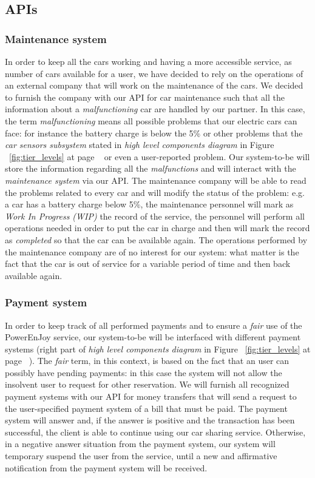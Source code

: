 \documentclass[10pt, a4paper,titlepage]{article}
\begin{document}
\subsection{APIs}
\subsubsection{Maintenance system}
In order to keep all the cars working and having a more accessible service, as number of cars available for a user, we have decided to rely on the operations of an external company that will work on the maintenance of the cars. We decided to furnish the company with our API for car maintenance such that all the information about a \emph{malfunctioning} car are handled by our partner. In this case, the term \emph{malfunctioning} means all possible problems that our electric cars can face: for instance the battery charge is below the 5\% or other problems that the \emph{car sensors subsystem} stated in \emph{high level components diagram} in Figure ~\ref{fig:tier_levels} at page ~\pageref{fig:tier_levels} or even a user-reported problem. Our system-to-be will store the information regarding all the \emph{malfunctions} and will interact with the \emph{maintenance system} via our API. The maintenance company will be able to read the problems related to every car and will modify the status of the problem: e.g. a car has a battery charge below 5\%, the maintenance personnel will mark as \emph{Work In Progress (WIP)} the record of the service, the personnel will perform all operations needed in order to put the car in charge and then will mark the record as \emph{completed} so that the car can be available again. The operations performed by the maintenance company are of no interest for our system: what matter is the fact that the car is out of service for a variable period of time and then back available again.
\subsubsection{Payment system}
In order to keep track of all performed payments and to ensure a \emph{fair} use of the PowerEnJoy service, our system-to-be will be interfaced with different payment systems (right part of \emph{high level components diagram} in Figure ~\ref{fig:tier_levels} at page ~\pageref{fig:tier_levels}). The \emph{fair} term, in this context, is based on the fact that an user can possibly have pending payments: in this case the system will not allow the insolvent user to request for other reservation. We will furnish all recognized payment systems with our API for money transfers that will send a request to the user-specified payment system of a bill that must be paid. The payment system will answer and, if the answer is positive and the transaction has been successful, the client is able to continue using our car sharing service. Otherwise, in a negative answer situation from the payment system, our system will temporary suspend the user from the service, until a new and affirmative notification from the payment system will be received. 
\end{document}
